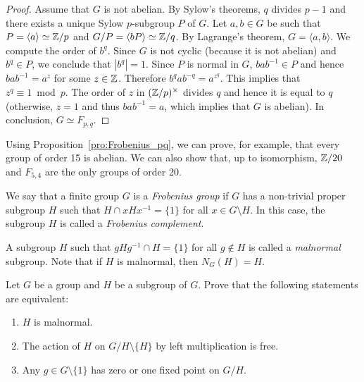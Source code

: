 \begin{proof}
    Assume that $G$ is not abelian. By Sylow's theorems, 
    $q$ divides $p-1$ and there exists 
    a unique Sylow $p$-subgroup $P$ of $G$. Let $a,b\in G$ be such that 
    $P=\langle a\rangle\simeq\mathbb{Z}/p$ and $G/P=\langle bP\rangle\simeq\mathbb{Z}/q$. By Lagrange's theorem, 
    $G=\langle a,b\rangle$. We compute the order of $b^q$. Since 
    $G$ is not cyclic (because it is not abelian) and $b^q\in P$, 
    we conclude that $|b^q|=1$. 
    Since $P$ is normal in $G$, 
    $bab^{-1}\in P$ and hence $bab^{-1}=a^z$ for some $z\in\mathbb{Z}$. Therefore
    $b^qab^{-q}=a^{z^q}$. This implies that 
    $z^q\equiv1\bmod p$. The order of $z$ in $(\mathbb{Z}/p)^{\times}$ divides 
    $q$ and hence it is equal to $q$ (otherwise, $z=1$ and thus $bab^{-1}=a$, which implies
    that $G$ is abelian). In conclusion, 
    $G\simeq F_{p,q}$. 
\end{proof}

Using Proposition~\ref{pro:Frobenius_pq}, we can prove, for example, that every group of order 15 is abelian. We can also show that, up to isomorphism, $\mathbb{Z}/20$ and $F_{5,4}$ are the only groups of order 20.

\begin{definition}
  We say that a finite group $G$ is a 
  \emph{Frobenius group} if $G$ 
  has a non-trivial proper subgroup $H$ such that $H\cap
  xHx^{-1}=\{1\}$ for all $x\in G\setminus H$. In this case, the subgroup 
  $H$ is called a \emph{Frobenius complement}.
\end{definition}

A subgroup $H$ such that $gHg^{-1}\cap H=\{1\}$ for all 
$g\not\in H$ is called a \emph{malnormal} subgroup. 
Note that if $H$ is malnormal, then $N_G(H)=H$. 

\begin{exercise}
\label{xca:malnormal}
    Let $G$ be a group and $H$ be a subgroup of $G$. Prove that the following statements are equivalent: 
    \begin{enumerate}
        \item $H$ is malnormal. 
        \item The action of $H$ 
            on $G/H\setminus\{H\}$ by left multiplication is free. 
        \item Any $g\in G\setminus\{1\}$ has zero
            or one fixed point on $G/H$. 
    \end{enumerate}
\end{exercise}

